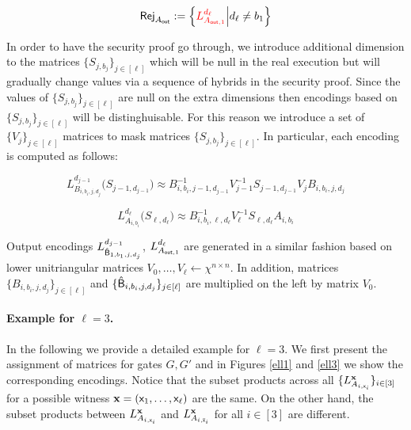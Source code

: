           \begin{equation}\label{rejAout}
\mathsf{Rej}_{A_{\mathsf{out}}}:=\Big\{{\color{red}L_{A_{\mathsf{out},1}}^{d_{\ell}}}\Big | d_{\ell} \neq b_1\Big\}
         \end{equation}
      
      In order to have the security proof go through, we introduce additional dimension to the matrices $\{S_{j,b_j}\}_{j\in[\ell]}$ which will be null in the real execution but will gradually change values via a sequence of hybrids in the security proof. Since the values of $\{S_{j,b_j}\}_{j\in[\ell]}$ are null on the extra dimensions then encodings based on $\{S_{j,b_j}\}_{j\in[\ell]}$ will be distinghuisable. For this reason we introduce a set of $\{V_j\}_{j\in[\ell]}$ matrices to mask matrices $\{S_{j,b_j}\}_{j\in[\ell]}$. In particular, each encoding is computed as follows: %
      
      
      \begin{equation*}
L_{B_{i,b_i,j,d_j}}^{d_{j-1}}\big(S_{j-1,d_{j-1}}\big)\approx  B_{i,b_i,j-1,d_{j-1}}^{-1}V_{j-1}^{-1}S_{j-1,d_{j-1}}V_{j}B_{i,b_i,j,d_{j}} 
         \end{equation*}   
  
  \begin{equation*}
L_{A_{i,b_i}}^{d_{\ell}}\big(S_{\ell,d_{\ell}}\big)\approx B_{i,b_i,\ell,d_{\ell}}^{-1}V_{\ell}^{-1}S_{\ell,d_{\ell}}A_{i,b_i}  \end{equation*}
  
Output encodings $L_{\mathsf{\hat{B}}_{1,b_1,j,d_j}}^{d_{j-1}}$, $L_{A_{\mathsf{out},1}}^{d_{\ell}}$ are generated in a similar fashion based on lower unitriangular matrices $V_{0},\ldots, V_\ell  \leftarrow \chi^{n\times n}$. In addition, matrices $\{B_{i,b_i,j,d_j}\}_{j\in[\ell]}$ and $\{\mathsf{\hat{B}}_{i,b_i,j,d_j}\}_{j\in[\ell]}$ are multiplied on the left by matrix $V_0$.   
\paragraph{Example for $\ell=3$.}
In the following we provide a detailed example for $\ell=3$. We first present the assignment of matrices for gates $G,G'$ and in Figures \ref{ell1} and \ref{ell3} we show the corresponding encodings. Notice that the subset products across all $\{L_{A_{i,\mathsf{x}_i}}^{\mathsf{{\bf x}}}\}_{i\in[3]}$ for a possible witness $\mathsf{{\bf x}}=(\mathsf{x}_1,\ldots,\mathsf{x}_\ell)$ are the same. On the other hand, the subset products 
between $L_{A_{i,\mathsf{x}_i}}^{\mathsf{{\bf x}}}$ and $L_{A_{i,\bar {\mathsf{x}}_i}}^{\mathsf{{\bf x}}}$ for all $i\in[3]$ are different. 

